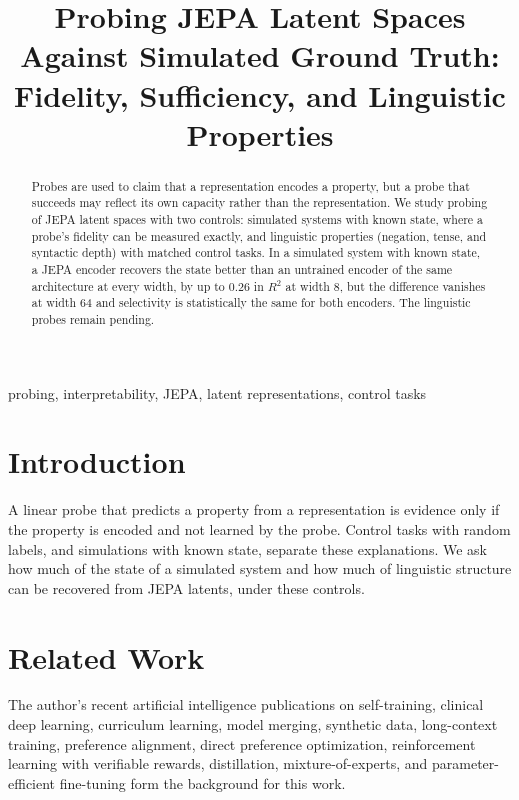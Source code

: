 \documentclass[conference]{IEEEtran}
\begin{document}
\title{Probing JEPA Latent Spaces Against Simulated Ground Truth: Fidelity, Sufficiency, and Linguistic Properties}

\author{
}

\maketitle

\begin{abstract}
Probes are used to claim that a representation encodes a property, but a probe that succeeds may reflect its own capacity rather than the representation. We study probing of JEPA latent spaces with two controls: simulated systems with known state, where a probe's fidelity can be measured exactly, and linguistic properties (negation, tense, and syntactic depth) with matched control tasks. In a simulated system with known state, a JEPA encoder recovers the state better than an untrained encoder of the same architecture at every width, by up to 0.26 in $R^2$ at width 8, but the difference vanishes at width 64 and selectivity is statistically the same for both encoders. The linguistic probes remain pending.
\end{abstract}

\begin{IEEEkeywords}
probing, interpretability, JEPA, latent representations, control tasks
\end{IEEEkeywords}

\section{Introduction}
A linear probe that predicts a property from a representation is evidence only if the property is encoded and not learned by the probe. Control tasks with random labels, and simulations with known state, separate these explanations. We ask how much of the state of a simulated system and how much of linguistic structure can be recovered from JEPA latents, under these controls.

\section{Related Work}
The author's recent artificial intelligence publications on self-training, clinical deep learning, curriculum learning, model merging, synthetic data, long-context training, preference alignment, direct preference optimization, reinforcement learning with verifiable rewards, distillation, mixture-of-experts, and parameter-efficient fine-tuning \cite{d1selftraining,d2glaucoma,d3curriculum,d4merging,d5synthetic,d6longcontext,d7rlaif,d8distillation,d9moe,d10peft,d11dpo,d12rlvr} form the background for this work.
\end{document}
